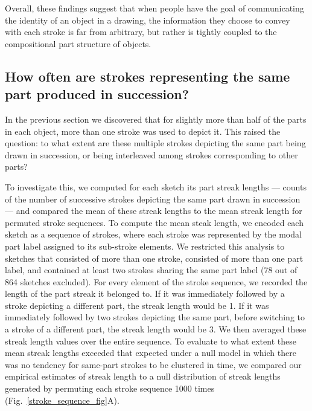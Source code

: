 \documentclass[10pt,letterpaper]{article}
\begin{document}
Overall, these findings suggest that when people have the goal of communicating the identity of an object in a drawing, the information they choose to convey with each stroke is far from arbitrary, but rather is tightly coupled to the compositional part structure of objects. 

\subsection{How often are strokes representing the same part produced in succession?}

In the previous section we discovered that for slightly more than half of the parts in each object, more than one stroke was used to depict it. 
This raised the question: to what extent are these multiple strokes depicting the same part being drawn in succession, or being interleaved among strokes corresponding to other parts?

To investigate this, we computed for each sketch its part streak lengths — counts of the number of successive strokes depicting the same part drawn in succession — and compared the mean of these streak lengths to the mean streak length for permuted stroke sequences. 
To compute the mean steak length, we encoded each sketch as a sequence of strokes, where each stroke was represented by the modal part label assigned to its sub-stroke elements. 
We restricted this analysis to sketches that consisted of more than one stroke, consisted of more than one part label, and contained at least two strokes sharing the same part label (78 out of 864 sketches excluded). 
For every element of the stroke sequence, we recorded the length of the part streak it belonged to. 
If it was immediately followed by a stroke depicting a different part, the streak length would be 1. 
If it was immediately followed by two strokes depicting the same part, before switching to a stroke of a different part, the streak length would be 3. 
We then averaged these streak length values over the entire sequence. 
To evaluate to what extent these mean streak lengths exceeded that expected under a null model in which there was no tendency for same-part strokes to be clustered in time, we compared our empirical estimates of streak length to a null distribution of streak lengths generated by permuting each stroke sequence 1000 times (Fig.~\ref{stroke_sequence_fig}A). 
\end{document}
